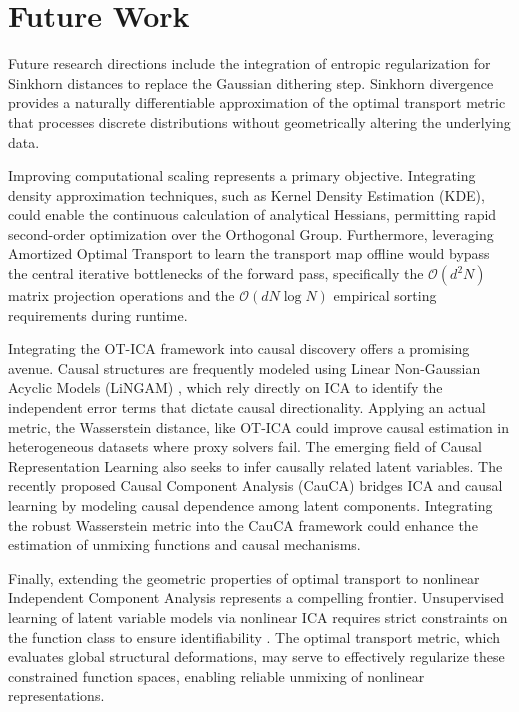 \documentclass[12pt,a4paper,twoside,openany]{book}
\begin{document}
\section{Future Work}
Future research directions include the integration of entropic regularization for Sinkhorn distances \cite{cuturi2013sinkhorn, peyre2019computational} 
to replace the Gaussian dithering step. Sinkhorn divergence provides a naturally differentiable approximation of the optimal transport metric 
that processes discrete distributions without geometrically altering the underlying data.

Improving computational scaling represents a primary objective. Integrating density approximation techniques, 
such as Kernel Density Estimation (KDE), could enable the continuous calculation of analytical Hessians, 
permitting rapid second-order optimization over the Orthogonal Group. Furthermore, 
leveraging Amortized Optimal Transport to learn the transport map offline would bypass the central 
iterative bottlenecks of the forward pass, specifically the $\mathcal{O}(d^2 N)$ matrix projection operations and 
the $\mathcal{O}(d N \log N)$ empirical sorting requirements during runtime.

Integrating the OT-ICA framework into causal discovery offers a promising avenue. Causal structures are frequently modeled using 
Linear Non-Gaussian Acyclic Models (LiNGAM) \cite{shimizu2006linear}, which rely directly on ICA to identify the independent error terms 
that dictate causal directionality. Applying an actual metric, the Wasserstein distance, like OT-ICA could improve causal estimation in heterogeneous 
datasets where proxy solvers fail. The emerging field of Causal Representation Learning also seeks to infer causally 
related latent variables. The recently proposed Causal Component Analysis (CauCA) \cite{liang2023causal} bridges ICA and causal learning by modeling 
causal dependence among latent components. Integrating the robust Wasserstein metric into the CauCA framework could 
enhance the estimation of unmixing functions and causal mechanisms.

Finally, extending the geometric properties of optimal transport to nonlinear Independent Component Analysis represents a compelling frontier. 
Unsupervised learning of latent variable models via nonlinear ICA requires strict constraints on the function class to 
ensure identifiability \cite{buchholz2022function}. The optimal transport metric, which evaluates global structural deformations, 
may serve to effectively regularize these constrained function spaces, enabling reliable unmixing of nonlinear representations.
\end{document}
